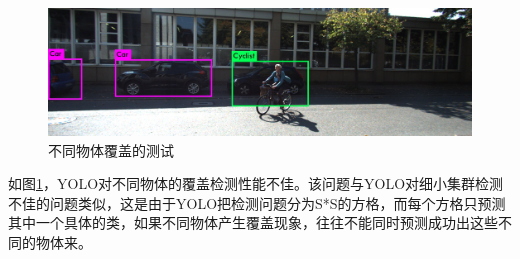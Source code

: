 {	\begin{figure}[htbp]
	\centering
	\includegraphics[width=5in]{images/error3.jpg}
	\caption{不同物体覆盖的测试}
	\label{error3}
	\end{figure}
	如图\ref{error3}，YOLO对不同物体的覆盖检测性能不佳。该问题与YOLO对细小集群检测不佳的问题类似，这是由于YOLO把检测问题分为S*S的方格，而每个方格只预测其中一个具体的类，如果不同物体产生覆盖现象，往往不能同时预测成功出这些不同的物体来。
}

